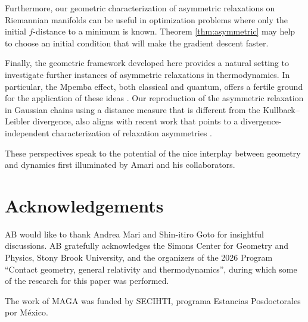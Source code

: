 \documentclass{amsart}
\theoremstyle{definition}
\begin{document}
Furthermore, our geometric characterization of asymmetric relaxations on 
Riemannian manifolds can be useful in optimization problems where only the initial $f$-distance 
to a minimum is known. Theorem \ref{thm:asymmetric} may help to choose an initial condition that will make the gradient descent faster.

Finally, the geometric framework developed here provides a natural setting to investigate further instances of asymmetric relaxations in thermodynamics. In particular, the Mpemba effect, both classical and quantum, offers a fertile ground for the application of these ideas \cite{biswas2023mpemba,biswas2023mpembalangevin,qian2025intrinsic,ares2025quantum,bettmann2025information}. 
Our reproduction of the asymmetric relaxation in Gaussian chains using a distance measure that is different from the Kullback–Leibler divergence, also aligns with recent work that points to a divergence-independent characterization of relaxation asymmetries \cite{van_vu_thermomajorization_2025}.


These perspectives speak to the potential of the nice interplay between geometry and dynamics first illuminated by Amari and his collaborators. 


\section*{Acknowledgements}
AB would like to thank Andrea Mari and Shin-itiro Goto for insightful discussions.
AB gratefully acknowledges the Simons Center for Geometry and Physics, Stony Brook University, 
and the organizers of the 2026 Program ``Contact geometry,
general relativity and thermodynamics'', 
during which some of the research for this paper was performed.

The work of MAGA was funded by SECIHTI, programa Estancias
Posdoctorales por M\'exico.  
\end{document}
